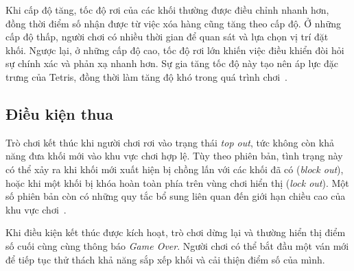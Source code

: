 Khi cấp độ tăng, tốc độ rơi của các khối thường được điều chỉnh
nhanh hơn, đồng thời điểm số nhận được từ việc xóa hàng cũng
tăng theo cấp độ. Ở những cấp độ thấp, người chơi có nhiều thời
gian để quan sát và lựa chọn vị trí đặt khối. Ngược lại, ở những
cấp độ cao, tốc độ rơi lớn khiến việc điều khiển đòi hỏi sự chính
xác và phản xạ nhanh hơn. Sự gia tăng tốc độ này tạo nên áp lực
đặc trưng của Tetris, đồng thời làm tăng độ khó trong quá trình
chơi~\cite{tetris_official,tetris_scoring}.

\subsection{Điều kiện thua}

Trò chơi kết thúc khi người chơi rơi vào trạng thái
\textit{top out}, tức không còn khả năng đưa khối mới vào khu vực
chơi hợp lệ. Tùy theo phiên bản, tình trạng này có thể xảy ra
khi khối mới xuất hiện bị chồng lấn với các khối đã có
(\textit{block out}), hoặc khi một khối bị khóa hoàn toàn phía
trên vùng chơi hiển thị (\textit{lock out}). Một số phiên bản
còn có những quy tắc bổ sung liên quan đến giới hạn chiều cao
của khu vực chơi~\cite{tetris_topout,tetris_guideline}.

Khi điều kiện kết thúc được kích hoạt, trò chơi dừng lại và
thường hiển thị điểm số cuối cùng cùng thông báo
\textit{Game Over}. Người chơi có thể bắt đầu một ván mới
để tiếp tục thử thách khả năng sắp xếp khối và cải thiện
điểm số của mình.
